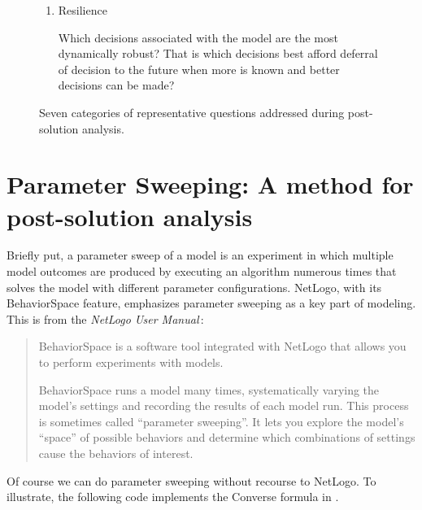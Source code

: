 \begin{figure}[h]
\begin{enumerate}
\item  Resilience

Which decisions associated with the model are the most dynamically robust? That is which decisions best afford deferral of decision to the future when more is known and better decisions can be made?
\end{enumerate}
\caption{Seven categories of representative questions addressed during post-solution analysis.}
\label{fig:post_solution_questions}
\figbot
\end{figure}

\clearpage

\section{Parameter Sweeping: A method for post-solution analysis\label{sec:parameter_sweep_intro}}


Briefly put, a parameter sweep of a model is an experiment in which multiple model outcomes are produced by executing an algorithm numerous times that solves the model with different parameter configurations.
NetLogo, with its BehaviorSpace feature,  emphasizes parameter sweeping as a key part of modeling.  This is  from the {\it NetLogo User Manual}\,:
\begin{quote}
BehaviorSpace is a software tool integrated with NetLogo that allows you to perform experiments with models.

BehaviorSpace runs a model many times, systematically varying the model's settings and recording the results of each model run. This process is sometimes called ``parameter sweeping''. It lets you explore the model's ``space'' of possible behaviors and determine which combinations of settings cause the behaviors of interest.
\end{quote}

\noindent Of course we can do parameter sweeping without recourse to NetLogo. To illustrate, the following code implements the Converse formula in \mlb . 

